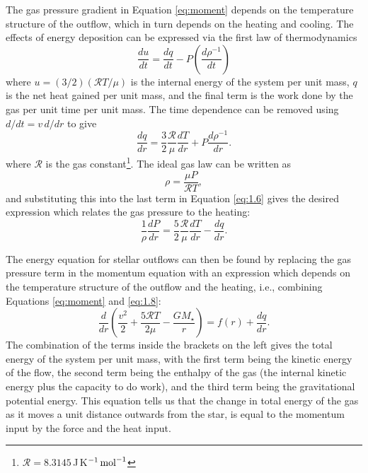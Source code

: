The gas pressure gradient in Equation \ref{eq:moment} depends on the temperature structure of the outflow, which in turn depends on the heating and cooling. The effects of energy deposition can be expressed via the first law of thermodynamics 
\begin{equation}
\frac{du}{dt}=\frac{dq}{dt}-P\left(\frac{d\rho ^{-1}}{dt} \right)
\end{equation}
where $u=(3/2)(\mathcal{R}T/\mu)$ is the internal energy of the system per unit mass, $q$ is the net heat gained per unit mass, and the final term is the work done by the gas per unit time per unit mass. The time dependence can be removed using $d/dt=v\,d/dr$ to give
\begin{equation}\label{eq:1.6}
\frac{dq}{dr}=\frac{3}{2}\frac{\mathcal{R}}{\mu}\frac{dT}{dr}+P\frac{d\rho ^{-1}}{dr}.
\end{equation}
where $\mathcal{R}$ is the gas constant\footnote{$\mathcal{R} = 8.3145$\,J\,K$^{-1}\,\rm{mol}^{-1}$}. The ideal gas law can be written as 
\begin{equation}
\rho = \frac{\mu P}{\mathcal{R}T},
\end{equation}
and substituting this into the last term in Equation \ref{eq:1.6} gives the desired expression which relates the gas pressure to the heating:
\begin{equation}\label{eq:1.8}
\frac{1}{\rho}\dfrac{dP}{dr}=\dfrac{5}{2}\dfrac{\mathcal{R}}{\mu}\dfrac{dT}{dr}-\frac{dq}{dr}.
\end{equation}

The energy equation for stellar outflows can then be found by replacing the gas pressure term in the momentum equation with an expression which depends on the temperature structure of the outflow and the heating, i.e., combining Equations \ref{eq:moment} and \ref{eq:1.8}:
\begin{equation}\label{eq:1.9a}
\frac{d}{dr}\left(\frac{v^2}{2} + \frac{5\mathcal{R}T}{2\mu}-\frac{GM_{\star}}{r}\right)= f(r)+\frac{dq}{dr}.
\end{equation}
The combination of the terms inside the brackets on the left gives the total energy of the system per unit mass, with the first term being the kinetic energy of the flow, the second term being the enthalpy of the gas (the internal kinetic energy plus the capacity to do work), and the third term being the gravitational potential energy.  This equation tells us that the change in total energy of the gas as it moves a unit distance outwards from the star, is equal to the momentum input by the force and the heat input.

